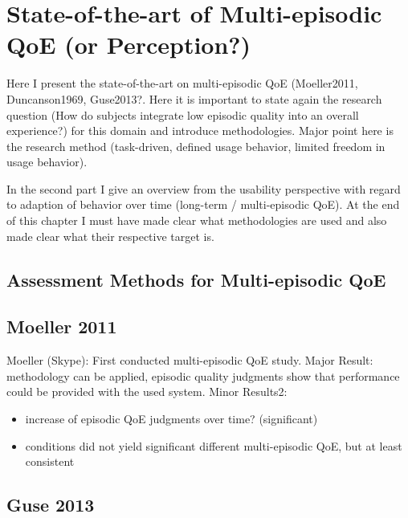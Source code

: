 \chapter{State-of-the-art of Multi-episodic QoE (or Perception?)}\label{chap:05} %
\begin{chapter-abstract}

Here I present the state-of-the-art on multi-episodic QoE (Moeller2011, Duncanson1969, Guse2013?.
Here it is important to state again the research question (How do subjects integrate low episodic quality into an overall experience?) for this domain and introduce methodologies.
Major point here is the research method (task-driven, defined usage behavior, limited freedom in usage behavior).

In the second part I give an overview from the usability perspective with regard to adaption of behavior over time (long-term / multi-episodic QoE).
At the end of this chapter I must have made clear what methodologies are used and also made clear what their respective target is.

\end{chapter-abstract}


\section{Assessment Methods for Multi-episodic QoE}

\section{Moeller 2011}
Moeller (Skype): First conducted multi-episodic QoE study.
Major Result: methodology can be applied, episodic quality judgments show that performance could be provided with the used system.
Minor Results2: 
\begin{itemize}
\item increase of episodic QoE judgments over time? (significant)
\item conditions did not yield significant different multi-episodic QoE, but at least consistent
\end{itemize}
\section{Guse 2013}
